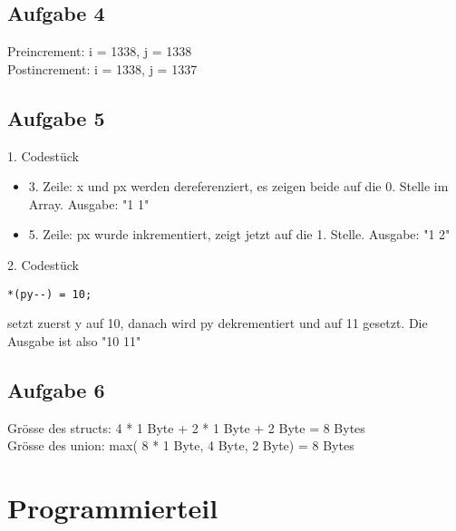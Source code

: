 \documentclass[a4paper,abstracton]{scrartcl}
\begin{document}
\subsection{Aufgabe 4}
Preincrement: i = 1338, j = 1338 \\
Postincrement: i = 1338, j = 1337

\subsection{Aufgabe 5}
1. Codestück
\begin{itemize}
	\item 3. Zeile: x und px werden dereferenziert, es zeigen beide auf die 0. Stelle im Array. Ausgabe: "1 1"
	\item 5. Zeile: px wurde inkrementiert, zeigt jetzt auf die 1. Stelle. Ausgabe: "1 2"
\end{itemize}


2. Codestück
\begin{verbatim}
*(py--) = 10;
\end{verbatim} setzt zuerst y auf 10, danach wird py dekrementiert und auf 11 gesetzt. Die Ausgabe ist also "10 11"

\subsection{Aufgabe 6}
Grösse des structs: 4 * 1 Byte + 2 * 1 Byte + 2 Byte = 8 Bytes \\
Grösse des union: max( 8 * 1 Byte, 4 Byte, 2 Byte) = 8 Bytes

\section{Programmierteil}

\end{document}
